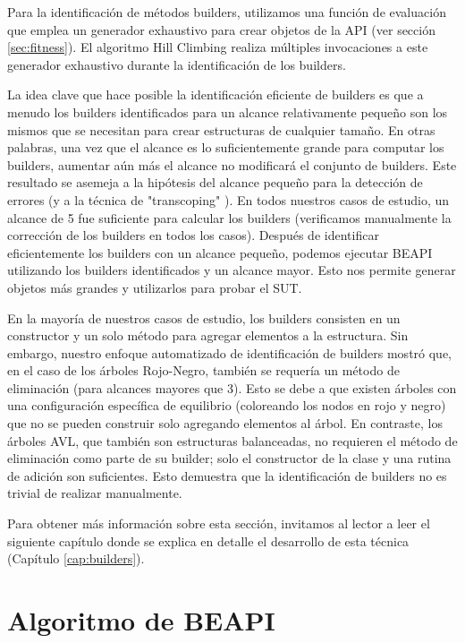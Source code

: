 Para la identificación de métodos builders, utilizamos una función de evaluación que emplea un generador exhaustivo para crear objetos de la API (ver sección \ref{sec:fitness}). El algoritmo Hill Climbing realiza múltiples invocaciones a este generador exhaustivo durante la identificación de los builders.

La idea clave que hace posible la identificación eficiente de builders es que a menudo los builders identificados para un alcance relativamente pequeño son los mismos que se necesitan para crear estructuras de cualquier tamaño. En otras palabras, una vez que el alcance es lo suficientemente grande para computar los builders, aumentar aún más el alcance no modificará el conjunto de builders. Este resultado se asemeja a la hipótesis del alcance pequeño para la detección de errores \cite{Andoni02} (y a la técnica de "transcoping" \cite{Rosner13}). En todos nuestros casos de estudio, un alcance de 5 fue suficiente para calcular los builders (verificamos manualmente la corrección de los builders en todos los casos). Después de identificar eficientemente los builders con un alcance pequeño, podemos ejecutar \textsf{BEAPI} utilizando los builders identificados y un alcance mayor. Esto nos permite generar objetos más grandes y utilizarlos para probar el SUT.

En la mayoría de nuestros casos de estudio, los builders consisten en un constructor y un solo método para agregar elementos a la estructura. Sin embargo, nuestro enfoque automatizado de identificación de builders mostró que, en el caso de los árboles Rojo-Negro, también se requería un método de eliminación (para alcances mayores que 3). Esto se debe a que existen árboles con una configuración específica de equilibrio (coloreando los nodos en rojo y negro) que no se pueden construir solo agregando elementos al árbol. En contraste, los árboles AVL, que también son estructuras balanceadas, no requieren el método de eliminación como parte de su builder; solo el constructor de la clase y una rutina de adición son suficientes. Esto demuestra que la identificación de builders no es trivial de realizar manualmente.

Para obtener más información sobre esta sección, invitamos al lector a leer el siguiente capítulo donde se explica en detalle el desarrollo de esta técnica (Capítulo \ref{cap:builders}).

\section{Algoritmo de BEAPI}
\label{sec:beapiTechnique}

